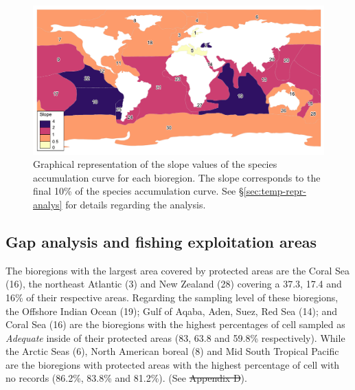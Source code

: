 \documentclass[12pt,authoryear]{elsarticle}
\providecommand{\DIFaddtex}[1]{{\protect\color{blue}\uwave{#1}}} %
\providecommand{\DIFdeltex}[1]{{\protect\color{red}\sout{#1}}}                      %
\providecommand{\DIFaddbegin}{} %
\providecommand{\DIFaddend}{} %
\providecommand{\DIFdelbegin}{} %
\providecommand{\DIFdelend}{} %
\providecommand{\DIFadd}[1]{\texorpdfstring{\DIFaddtex{#1}}{#1}} %
\providecommand{\DIFdel}[1]{\texorpdfstring{\DIFdeltex{#1}}{}} %
\begin{document}
\begin{figure}
  \centering
  \includegraphics[width=\textwidth]{Fig_4}
    \caption{Graphical representation of the slope values of the species accumulation curve  for each bioregion. The slope corresponds to the final 10\%  of the species accumulation curve. See \S \ref{sec:temp-repr-analys} for details regarding the analysis.}
     \label{fig:Slopefinal}
\end{figure}

\subsection{Gap analysis and fishing exploitation areas}
\label{sec:GAP}

The bioregions with the largest area covered by protected areas are the Coral Sea (16), the northeast Atlantic (3) and New Zealand (28) covering a 37.3, 17.4 and 16\% of their respective areas.
Regarding the sampling level of these bioregions, the Offshore Indian Ocean (19); Gulf of Aqaba, Aden, Suez, Red Sea (14); and Coral Sea (16) are the bioregions with the highest percentages of cell sampled as \textit{Adequate}
inside of their protected areas (83, 63.8 and 59.8\% respectively).
While the Arctic Seas (6), North American boreal (8) and Mid South Tropical Pacific are the bioregions with protected areas with the highest percentage of cell with no records (86.2\%, 83.8\% and 81.2\%).
(See \DIFdelbegin \DIFdel{Appendix D}\DIFdelend \DIFaddbegin \DIFadd{\ref{sec:gap-analysis-1}}\DIFaddend ).
\end{document}
